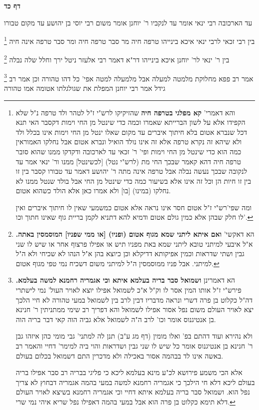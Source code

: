 \documentclass[12pt, openany]{book}
\newcommand{\sethebfont}{
\fontsize{10.5pt}{21.0pt} \selectfont
}
\newcommand{\twocol}[1]{
	{\sethebfont \begin{multicols}{2}
			#1
	\end{multicols}}	
}
\newcommand{\sectname}{}
\newcommand{\newsection}[1]{
	\addcontentsline{toc}{section}{#1}
	\renewcommand{\sectname}{#1}	
	\vspace{-\baselineskip}
	\begin{center}
		\textbf{%
\fontsize{16pt}{16pt}\selectfont
			#1}
	\end{center}
	\vspace{-\baselineskip}
	\nopagebreak
}
\newcommand{\footnotecomment}[1]{
	\renewcommand\thefootnote{}
	\footnote{#1}}
\newcommand{\commenta}[1]{\footnotecomment{#1}}
\begin{document}
\newsection{דף כד}
\twocol{עד הארכובה רבי ינאי אומר עד לנקביו ר' יוחנן אומר משום רבי יוסי בן יהושע עד מקום טבורו 
\commenta{ והא דאמרי' \textbf{קא מפלגי בטרפה חיה} שהזיקיקו לרש"י ז"ל לטהר ולד טרפה נ"ל שלא הקפידו אלא על לשון הברייתא שאמרו וכמה כדי שינטל מן החי וימות דקסבר האי תנא דכל שנברא אטום בלא חיתוך איברים עד מקום שאלו ינטל מן החי וימות אינו בכלל ולד ולא שיהא זה נקרא טרפה אלא זה אינו נולד הואיל ונברא אטום אבל נחלקו האמוראין כמה הוא כדי שינטל מן החי וימות ופי' ר' זכאי עד לארכובה ודקדקו ממנו שהוא סובר טרפה חיה דהא קאמר שבכך החי מת (לרש"י נטל) [לכשינטל] ממנו ור' ינאי אמר עד לנקובה שבכך נעשה נבלה אבל טרפה אינה מתה ר' יהושע דאמר עד טבורו קסבר בין זו בין זו חיות הן וכל זה אינו אלא בשיעור כמה כדי שינטל מן החי אבל בולד שנטל ממנו לא נחלקו (במינו) [בו] ולא אמרו כאן אלא הולד כשהוא אטום.\par ומה שפי'רש"י ז"ל אטום חסר אינו נראה אלא אטום כמשמעי שאין לו חיתוך איברים ואין לו חלק שבהן אלא כמין גולם אטום ודמיא להא דתניא לקמן בריית גוף שאינו חתוך וכו'. }
בין רבי זכאי לרבי ינאי איכא בינייהו טרפה חיה מר סבר טרפה חיה ומר סבר טרפה אינה חיה 
\commenta{ הא דאקשי' \textbf{ואם איתא ליתני שמא מגוף אטום (ופניו) [או ממי שפניו] המוסמסין באתה.} א"ל איבעי למיתני טובא ליתני שמא באת מפניו תיש או אפילו פרצוף אחר או שיש לו שני גבין ושתי שדראות וכמין אפיקותא דדיקלא וכן כיוצא בהן א"ל הנהו לא שכיחי ולא ה"ל למיתני. אבל פניו ממוסמסין ה"ל למיתני משום דשכיח נמי טפי מגוף אטום. }
בין ר' ינאי לר' יוחנן איכא בינייהו דר"א דאמר רבי אלעזר ניטל ירך וחלל שלה נבלה 
\commenta{הא דאמרינן \textbf{ושמואל סבר בריה בעלמא איתא וכי אגמריה רחמנא למשה בעלמא.} פירש"י ז"ל אותו המין אסר לו וק"ל א"כ לשמואל אפילו יוצא לאויר העול' נמי לישתרי דה"ל כקלוט בן פרה דשרי ונראה מדבריו דבין לרב בין לשמואל במעי טהורה לא חיי הלכך יצא לאויר העולם משום נפל אסור אפילו לשמואל והא דפריך רב שימי ממתניתין ר' חנינא בן אנטיגנוס אומר וכו' לרב ה"ה לשמואל אלא גביה הוה קאי דבר בריה הוה.\par ולא נהירא ועוד דהתם בפ' ואלו מומין (דף מג ע"ב) תנן לה למתני' גבי מומי כהן איזהו גבן ר' חנינא בן אנטיגנוס אומר כל שיש לו שני גבין ושדראות והוי ביה למימר' דחיי והאמר רב באשה אינו לד בבהמה אסור באכילה ולא מדכרין התם דשמואל בכלום בעולם.\par אלא הכי משמע פירושא לכ"ע מינא בעלמא ליכא כי פליגי בבריה רב סבר אפילו בריה בעולם ליכא דלא חי הילכך כי אגמריה רחמנא למשה במעי בהמה אגמריה דבחוץ לא צריך נפל הוא. ושמואל סבר בריה בעלמא איתא דחיי וכי אגמריה רחמנא בשיצא לאויר העולם דלא תימא כקלוט בן פרה הוא אבל במעי בהמה דאפילו נפל שריא איהי נמי שרי. }
אמר רב פפא מחלוקת מלמטה למעלה אבל מלמעלה למטה אפי' כל דהו טהורה וכן אמר רב גידל אמר רבי יוחנן המפלת את שגולגלתו אטומה אמו טהורה 
}
\end{document}
